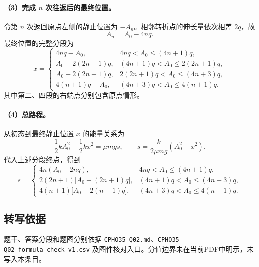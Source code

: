 \paragraph{（3）完成 $n$ 次往返后的最终位置。} 令第 $n$ 次返回原点左侧的静止位置为 $-A_n$。相邻转折点的伸长量依次相差 $2q$，故
\[A_n=A_0-4nq.\]
最终位置的完整分段为
\[
x=\begin{cases}
4nq-A_0,&4nq<A_0\leq(4n+1)q,\\
A_0-2(2n+1)q,&(4n+1)q<A_0\leq2(2n+1)q,\\
A_0-2(2n+1)q,&2(2n+1)q<A_0\leq(4n+3)q,\\
4(n+1)q-A_0,&(4n+3)q<A_0\leq4(n+1)q.
\end{cases}
\]
其中第二、四段的右端点分别包含原点情形。

\paragraph{（4）总路程。} 从初态到最终静止位置 $x$ 的能量关系为
\[\frac12kA_0^2-\frac12kx^2=\mu mgs,\qquad s=\frac{k}{2\mu mg}(A_0^2-x^2).\]
代入上述分段终点，得到
\[
s=\begin{cases}
4n(A_0-2nq),&4nq<A_0\leq(4n+1)q,\\
2(2n+1)\bigl[A_0-(2n+1)q\bigr],&(4n+1)q<A_0\leq(4n+3)q,\\
4(n+1)\bigl[A_0-2(n+1)q\bigr],&(4n+3)q<A_0\leq4(n+1)q.
\end{cases}
\]

\subsection{转写依据}
题干、答案分段和题图分别依据 \texttt{CPHO35-Q02.md}、\texttt{CPHO35-Q02\_formula\_check\_v1.csv} 及图件核对入口。分值边界未在当前PDF中明示，未写入本条目。
